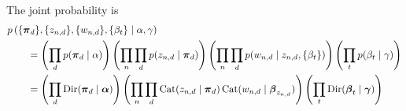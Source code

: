 The joint probability is
\begin{align}
    \hspace{2em}&\hspace{-2em}
    p\left(\{\vec \pi_d\}, \{z_{n, d}\}, \{w_{n, d}\}, \{\beta_t\} \given \alpha, \gamma\right) \\
    &= \left(\prod_d p(\vec \pi_d \given \alpha)\right) \left(\prod_n \prod_d p(z_{n,d} \given \vec \pi_d)\right) \left(\prod_n \prod_d p(w_{n, d} \given z_{n, d}, \{\beta_t\})\right) \left(\prod_t p(\beta_t \given \gamma)\right) \\
    &= \left(\prod_d \Dir(\vec \pi_d \given \vec \alpha)\right) \left(\prod_n \prod_d \Cat(z_{n, d} \given \vec \pi_d) \Cat(w_{n, d} \given \vec \beta_{z_{n, d}})\right) \left(\prod_t \Dir(\vec \beta_t \given \vec \gamma)\right)
\end{align}


